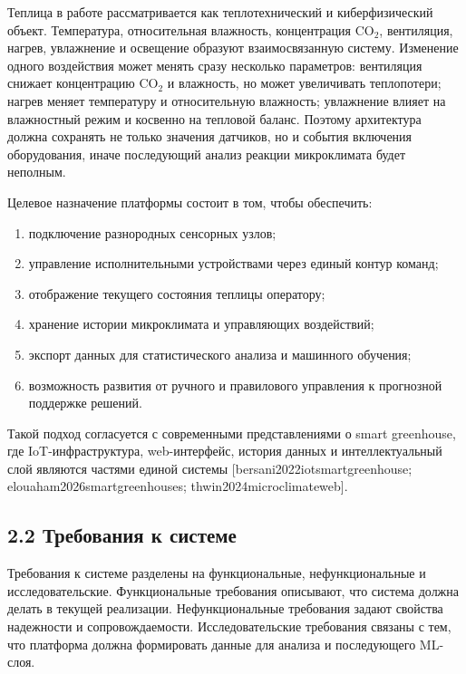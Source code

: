 \documentclass[a4paper,14pt]{extarticle}
\providecommand{\tightlist}{%
  \setlength{\itemsep}{0pt}\setlength{\parskip}{0pt}}
\begin{document}
Теплица в работе рассматривается как теплотехнический и киберфизический
объект. Температура, относительная влажность, концентрация CO\(_2\),
вентиляция, нагрев, увлажнение и освещение образуют взаимосвязанную
систему. Изменение одного воздействия может менять сразу несколько
параметров: вентиляция снижает концентрацию CO\(_2\) и влажность, но
может увеличивать теплопотери; нагрев меняет температуру и относительную
влажность; увлажнение влияет на влажностный режим и косвенно на тепловой
баланс. Поэтому архитектура должна сохранять не только значения
датчиков, но и события включения оборудования, иначе последующий анализ
реакции микроклимата будет неполным.

Целевое назначение платформы состоит в том, чтобы обеспечить:

\begin{enumerate}
\def\labelenumi{\arabic{enumi})}
\tightlist
\item
  подключение разнородных сенсорных узлов;
\item
  управление исполнительными устройствами через единый контур команд;
\item
  отображение текущего состояния теплицы оператору;
\item
  хранение истории микроклимата и управляющих воздействий;
\item
  экспорт данных для статистического анализа и машинного обучения;
\item
  возможность развития от ручного и правилового управления к прогнозной
  поддержке решений.
\end{enumerate}

Такой подход согласуется с современными представлениями о smart
greenhouse, где IoT-инфраструктура, web-интерфейс, история данных и
интеллектуальный слой являются частями единой системы
{[}bersani2022iotsmartgreenhouse; elouaham2026smartgreenhouses;
thwin2024microclimateweb{]}.

\subsection{2.2 Требования к
системе}\label{ux442ux440ux435ux431ux43eux432ux430ux43dux438ux44f-ux43a-ux441ux438ux441ux442ux435ux43cux435}

Требования к системе разделены на функциональные, нефункциональные и
исследовательские. Функциональные требования описывают, что система
должна делать в текущей реализации. Нефункциональные требования задают
свойства надежности и сопровождаемости. Исследовательские требования
связаны с тем, что платформа должна формировать данные для анализа и
последующего ML-слоя.
\end{document}
